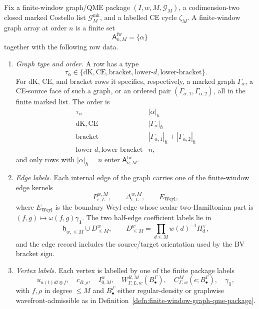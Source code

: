 \begin{defn}\label{defn:finite-window-graph-array}
  Fix a finite-window graph/QME package
  \((I,w,M,\mathcal G_M)\), a codimension-two closed marked Costello list
  \(\mathcal G^{\mathrm{mk}}_M\), and a labelled CE cycle \(\zeta_M\).
  A finite-window graph array at order \(n\) is a finite set
  \[
    \mathsf A^{\mathrm{fw}}_{n,M}
      =
    \{\alpha\}
  \]
  together with the following row data.

  \begin{enumerate}[label=(A\arabic*)]
    \item \emph{Graph type and order.}  A row has a type
    \[
      \tau_\alpha\in
      \{\mathrm{dK},\mathrm{CE},\mathrm{bracket},
        \mathrm{lower}\text{-}d,\mathrm{lower}\text{-}\mathrm{bracket}\}.
    \]
    For \(\mathrm{dK}\), \(\mathrm{CE}\), and \(\mathrm{bracket}\) rows it
    specifies, respectively, a marked graph \(\Gamma_\alpha\), a CE-source
    face of such a graph, or an ordered pair
    \((\Gamma_{\alpha,1},\Gamma_{\alpha,2})\), all in the finite marked list.
    The order is
    \[
    \begin{array}{c|c}
      \tau_\alpha & |\alpha|_\hbar \\ \hline
      \mathrm{dK},\mathrm{CE} & |\Gamma_\alpha|_\hbar\\
      \mathrm{bracket} &
        |\Gamma_{\alpha,1}|_\hbar+|\Gamma_{\alpha,2}|_\hbar\\
      \mathrm{lower}\text{-}d,\mathrm{lower}\text{-}\mathrm{bracket} & n ,
    \end{array}
    \]
    and only rows with \(|\alpha|_\hbar=n\) enter
    \(\mathsf A^{\mathrm{fw}}_{n,M}\).

    \item \emph{Edge labels.}  Each internal edge of the graph carries one of
    the finite-window edge kernels
    \[
      P_{\epsilon,L}^{w,M},\qquad
      \Delta_{\epsilon,L}^{w,M},\qquad
      E_{\mathrm{Weyl}},
    \]
    where \(E_{\mathrm{Weyl}}\) is the boundary Weyl edge whose scalar
    two-Hamiltonian part is
    \((f,g)\mapsto\omega(f,g)\gamma_{\mathbf 1}\).  The two half-edge
    coefficient labels lie in
    \[
      \mathfrak h_{w,\leq M}\cup D^w_{\leq M},
      \qquad
      D^w_{\leq M}=\prod_{d\leq M}w(d)^{-1}H_d^\vee,
    \]
    and the edge record includes the source/target orientation used by the
    BV bracket sign.

    \item \emph{Vertex labels.}  Each vertex is labelled by one of the
    finite package labels
    \[
      u_{a(t)dt\otimes f},\quad c_{B,\rho},\quad I^w_{0,M},\quad
      W^{R,M}_{\Gamma,L,w}(B^\Gamma_\bullet),\quad
      C^M_{\Gamma,w}(\epsilon;B^\Gamma_\bullet),\quad
      \gamma_{\mathbf 1},
    \]
    with \(f,\rho\) in degree \(\leq M\) and
    \(B^\Gamma_\bullet\) either regular-density or graphwise
    wavefront-admissible as in
    Definition~\ref{defn:finite-window-graph-qme-package}.


\end{enumerate}
\end{defn}
